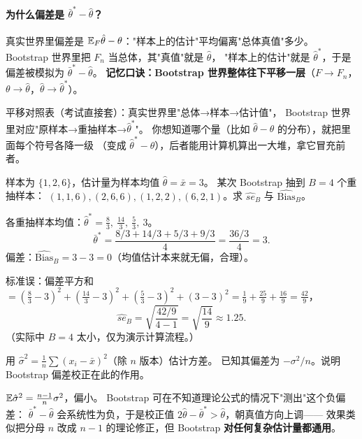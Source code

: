 \paragraph{为什么偏差是 $\bar\theta^*-\hat\theta$？}
真实世界里偏差是 $\mathbb{E}_F\hat\theta-\theta$："样本上的估计"平均偏离"总体真值"多少。
Bootstrap 世界里把 $F_n$ 当总体，其"真值"就是 $\hat\theta$，
"样本上的估计"就是 $\hat\theta^*$，于是偏差被模拟为 $\bar\theta^*-\hat\theta$。
\textbf{记忆口诀：Bootstrap 世界整体往下平移一层}（$F\to F_n$，$\theta\to\hat\theta$，$\hat\theta\to\hat\theta^*$）。

\begin{pbox}
平移对照表（考试直接套）：真实世界里"总体→样本→估计值"，
Bootstrap 世界里对应"原样本→重抽样本→$\hat\theta^*$"。
你想知道哪个量（比如 $\hat\theta-\theta$ 的分布），就把里面每个符号各降一级
（变成 $\hat\theta^*-\hat\theta$），后者能用计算机算出一大堆，拿它冒充前者。
\end{pbox}

\begin{exbox}
样本为 $\{1,2,6\}$，估计量为样本均值 $\hat\theta=\bar x=3$。
某次 Bootstrap 抽到 $B=4$ 个重抽样本：
$(1,1,6),(2,6,6),(1,2,2),(6,2,1)$。求 $\widehat{se}_B$ 与 $\widehat{\mathrm{Bias}}_B$。
\end{exbox}
\begin{sol}
各重抽样本均值：$\hat\theta^{*}=\frac{8}{3},\ \frac{14}{3},\ \frac{5}{3},\ 3$。
\[
\bar\theta^*=\frac{8/3+14/3+5/3+9/3}{4}=\frac{36/3}{4}=3 .
\]
偏差：$\widehat{\mathrm{Bias}}_B=3-3=0$（均值估计本来就无偏，合理）。

标准误：偏差平方和
$=(\tfrac{8}{3}-3)^2+(\tfrac{14}{3}-3)^2+(\tfrac{5}{3}-3)^2+(3-3)^2
=\tfrac19+\tfrac{25}9+\tfrac{16}9=\tfrac{42}9$，
\[
\widehat{se}_B=\sqrt{\frac{42/9}{4-1}}=\sqrt{\frac{14}{9}}\approx1.25 .
\]
（实际中 $B=4$ 太小，仅为演示计算流程。）
\end{sol}

\begin{exbox}[偏差校正的经典例子]
用 $\hat\sigma^2=\frac1n\sum(x_i-\bar x)^2$（除 $n$ 版本）估计方差。
已知其偏差为 $-\sigma^2/n$。说明 Bootstrap 偏差校正在此的作用。
\end{exbox}
\begin{sol}
$\mathbb{E}\hat\sigma^2=\frac{n-1}{n}\sigma^2$，偏小。
Bootstrap 可在不知道理论公式的情况下"测出"这个负偏差：
$\bar\theta^*-\hat\theta$ 会系统性为负，于是校正值
$2\hat\theta-\bar\theta^*>\hat\theta$，朝真值方向上调——
效果类似把分母 $n$ 改成 $n-1$ 的理论修正，但 Bootstrap \textbf{对任何复杂估计量都通用}。
\end{sol}

